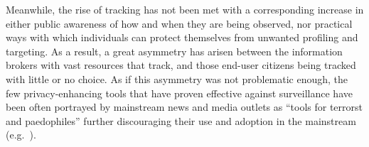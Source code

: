 \documentclass{IOS-Book-Article}     %
\begin{document}
Meanwhile, the rise of tracking has not been met with a corresponding increase
in either public awareness of how and when they are being observed, nor
practical ways with which individuals can protect themselves from unwanted profiling and
targeting.  As a result, a great asymmetry has arisen between the information
brokers with vast resources that track, and those end-user citizens being
tracked with little or no choice.  As if this asymmetry was not problematic
enough, the few privacy-enhancing tools that have proven effective against
surveillance have been often portrayed by mainstream news and media outlets as
``tools for terrorst and paedophiles'' further discouraging their use and
adoption in the mainstream (e.g.~\cite{bbctor,fbicommunities}).          
% 



\end{document}
